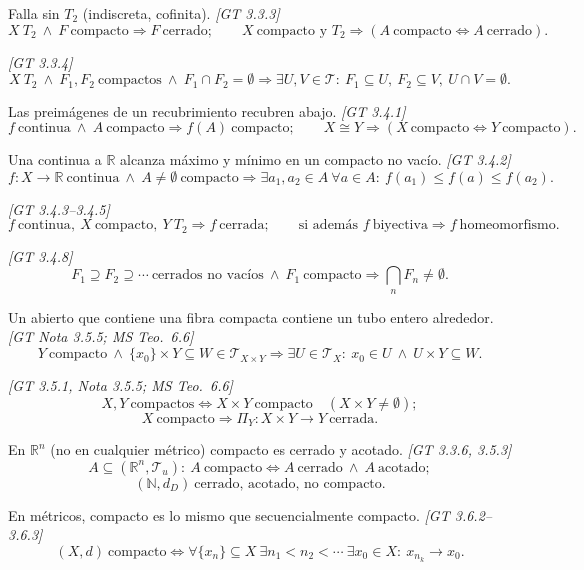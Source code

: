 \documentclass[11pt,a4paper]{article}
\theoremstyle{definition}
\theoremstyle{plain}
\newcommand{\fnt}[1]{{\normalfont\small\itshape\color{gray!150!black}[#1]}}
\newcommand{\R}{\mathbb{R}}
\newcommand{\N}{\mathbb{N}}
\newcommand{\tp}{\mathcal{T}}
\begin{document}
\begin{itemize}[leftmargin=1.3em,itemsep=3pt]
 Falla sin $T_2$ (indiscreta, cofinita). \fnt{GT 3.3.3}
\[ X\ T_2\ \wedge\ F\ \text{compacto}\Rightarrow F\ \text{cerrado};\qquad X\ \text{compacto y } T_2\Rightarrow(A\ \text{compacto}\iff A\ \text{cerrado}). \]

 \fnt{GT 3.3.4}
\[ X\ T_2\ \wedge\ F_1,F_2\ \text{compactos}\ \wedge\ F_1\cap F_2=\emptyset\Rightarrow\exists U,V\in\tp:\ F_1\subseteq U,\ F_2\subseteq V,\ U\cap V=\emptyset. \]

 Las preimágenes de un recubrimiento recubren abajo. \fnt{GT 3.4.1}
\[ f\ \text{continua}\ \wedge\ A\ \text{compacto}\Rightarrow f(A)\ \text{compacto};\qquad X\cong Y\Rightarrow(X\ \text{compacto}\iff Y\ \text{compacto}). \]

 Una continua a $\R$ alcanza máximo y mínimo en un compacto no vacío. \fnt{GT 3.4.2}
\[ f:X\to\R\ \text{continua}\ \wedge\ A\ne\emptyset\ \text{compacto}\Rightarrow\exists a_1,a_2\in A\ \forall a\in A:\ f(a_1)\le f(a)\le f(a_2). \]

 \fnt{GT 3.4.3--3.4.5}
\[ f\ \text{continua},\ X\ \text{compacto},\ Y\ T_2\Rightarrow f\ \text{cerrada};\qquad \text{si además } f\ \text{biyectiva}\Rightarrow f\ \text{homeomorfismo}. \]

 \fnt{GT 3.4.8}
\[ F_1\supseteq F_2\supseteq\cdots\ \text{cerrados no vacíos}\ \wedge\ F_1\ \text{compacto}\Rightarrow\textstyle\bigcap_nF_n\ne\emptyset. \]

 Un abierto que contiene una fibra compacta contiene un tubo entero alrededor. \fnt{GT Nota 3.5.5; MS Teo.\ 6.6}
\[ Y\ \text{compacto}\ \wedge\ \{x_0\}\times Y\subseteq W\in\tp_{X\times Y}\Rightarrow\exists U\in\tp_X:\ x_0\in U\ \wedge\ U\times Y\subseteq W. \]

 \fnt{GT 3.5.1, Nota 3.5.5; MS Teo.\ 6.6}
\[ X,Y\ \text{compactos}\iff X\times Y\ \text{compacto}\quad(X\times Y\ne\emptyset); \]
\[ X\ \text{compacto}\Rightarrow\Pi_Y:X\times Y\to Y\ \text{cerrada}. \]

 En $\R^n$ (no en cualquier métrico) compacto es cerrado y acotado. \fnt{GT 3.3.6, 3.5.3}
\[ A\subseteq(\R^n,\tp_u):\ A\ \text{compacto}\iff A\ \text{cerrado}\ \wedge\ A\ \text{acotado}; \]
\[ (\N,d_D)\ \text{cerrado, acotado, no compacto}. \]

 En métricos, compacto es lo mismo que secuencialmente compacto. \fnt{GT 3.6.2--3.6.3}
\[ (X,d)\ \text{compacto}\iff\forall\{x_n\}\subseteq X\ \exists n_1<n_2<\cdots\ \exists x_0\in X:\ x_{n_k}\to x_0. \]


\end{itemize}
\end{document}
